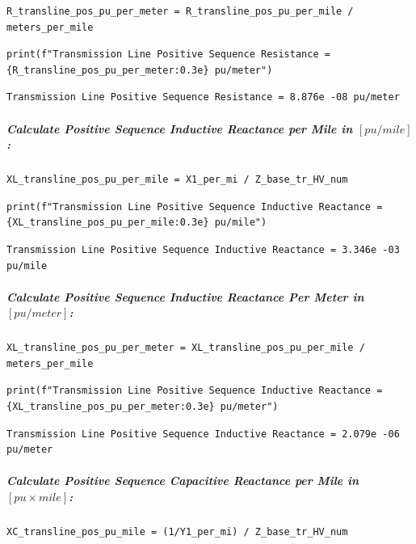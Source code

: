 \begin{verbatim}
R_transline_pos_pu_per_meter = R_transline_pos_pu_per_mile / meters_per_mile
\end{verbatim}

\begin{verbatim}
print(f"Transmission Line Positive Sequence Resistance = {R_transline_pos_pu_per_meter:0.3e} pu/meter")
\end{verbatim}

\begin{verbatim}
Transmission Line Positive Sequence Resistance = 8.876e -08 pu/meter
\end{verbatim}

\subparagraph{Calculate Positive Sequence Inductive Reactance per Mile in $\left[pu/mile\right]$:}

\begin{verbatim}
XL_transline_pos_pu_per_mile = X1_per_mi / Z_base_tr_HV_num
\end{verbatim}

\begin{verbatim}
print(f"Transmission Line Positive Sequence Inductive Reactance = {XL_transline_pos_pu_per_mile:0.3e} pu/mile")
\end{verbatim}

\begin{verbatim}
Transmission Line Positive Sequence Inductive Reactance = 3.346e -03 pu/mile
\end{verbatim}

\subparagraph{Calculate Positive Sequence Inductive Reactance Per Meter in $\left[pu/meter\right]$:}

\begin{verbatim}
XL_transline_pos_pu_per_meter = XL_transline_pos_pu_per_mile / meters_per_mile
\end{verbatim}

\begin{verbatim}
print(f"Transmission Line Positive Sequence Inductive Reactance = {XL_transline_pos_pu_per_meter:0.3e} pu/meter")
\end{verbatim}

\begin{verbatim}
Transmission Line Positive Sequence Inductive Reactance = 2.079e -06 pu/meter
\end{verbatim}

\subparagraph{Calculate Positive Sequence Capacitive Reactance per Mile in $\left[pu \times mile\right]$:}

\begin{verbatim}
XC_transline_pos_pu_mile = (1/Y1_per_mi) / Z_base_tr_HV_num
\end{verbatim}

